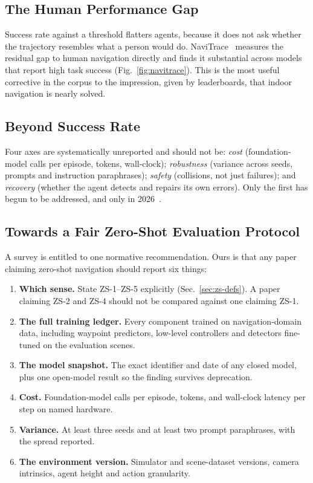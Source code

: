 \documentclass[journal]{IEEEtran}
\begin{document}
\subsection{The Human Performance Gap}
Success rate against a threshold flatters agents, because it does not ask
whether the trajectory resembles what a person would do.
NaviTrace~\cite{windecker2025navitrace} measures the residual gap to human
navigation directly and finds it substantial across models that report high
task success (Fig.~\ref{fig:navitrace}). This is the most useful corrective in the corpus to the
impression, given by leaderboards, that indoor navigation is nearly solved.

\subsection{Beyond Success Rate}
Four axes are systematically unreported and should not be:
\emph{cost} (foundation-model calls per episode, tokens, wall-clock);
\emph{robustness} (variance across seeds, prompts and instruction
paraphrases); \emph{safety} (collisions, not just failures); and
\emph{recovery} (whether the agent detects and repairs its own errors).
Only the first has begun to be addressed, and only in
2026~\cite{wang2026hydra,feng2026asynchronous,shinnick2026surf}.

\subsection{Towards a Fair Zero-Shot Evaluation Protocol}\label{sec:protocol}
A survey is entitled to one normative recommendation. Ours is that any paper
claiming zero-shot navigation should report six things:

\begin{enumerate}
\item \textbf{Which sense.} State ZS-1--ZS-5 explicitly
(Sec.~\ref{sec:zs-defs}). A paper claiming ZS-2 and ZS-4 should not be
compared against one claiming ZS-1.
\item \textbf{The full training ledger.} Every component trained on
navigation-domain data, including waypoint predictors, low-level
controllers and detectors fine-tuned on the evaluation scenes.
\item \textbf{The model snapshot.} The exact identifier and date of any
closed model, plus one open-model result so the finding survives
deprecation.
\item \textbf{Cost.} Foundation-model calls per episode, tokens, and
wall-clock latency per step on named hardware.
\item \textbf{Variance.} At least three seeds and at least two prompt
paraphrases, with the spread reported.
\item \textbf{The environment version.} Simulator and scene-dataset
versions, camera intrinsics, agent height and action granularity.
\end{enumerate}
\end{document}
